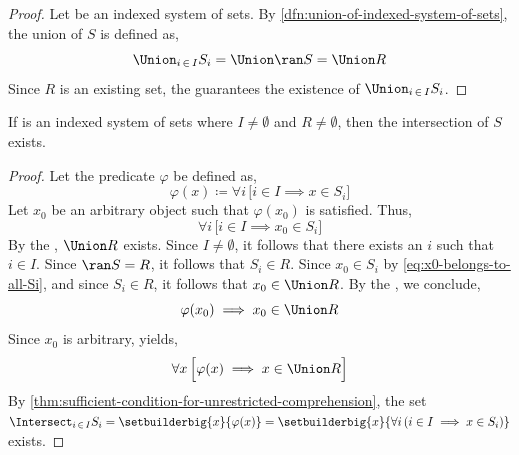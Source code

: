 \begin{proof}
    Let  be an indexed system of sets. By \cref{dfn:union-of-indexed-system-of-sets}, the
    union of \( S \) is defined as,
    \begin{equation*}
        \Union_{i \,\in\, I} S_{i} = \Union \ran S = \Union R
    \end{equation*}
    Since \( R \) is an existing set, the  guarantees the existence of \( \Union_{i \,\in\, I} S_{i} \).
\end{proof}

\begin{thm}
    \label{thm:existence-of-the-intersection-of-an-indexed-system-of-sets}
    If  is an indexed system of sets where \( I \neq \emptyset \) and \( R \neq \emptyset \),
    then the intersection of \( S \) exists.
\end{thm}

\begin{proof}
    Let the predicate \( \varphi \) be defined as,
    \begin{equation*}
        \varphi(x) \coloneq \forall i \, \Big[ i \in I \implies x \in S_{i} \Big]
    \end{equation*}
    Let \( x_{0} \) be an arbitrary object such that \( \varphi(x_{0}) \) is satisfied. Thus,
    \begin{equation}
        \label{eq:x0-belongs-to-all-Si}
        \forall i \, \Big[ i \in I \implies x_{0} \in S_{i} \Big]
    \end{equation}
    By the , \( \Union R \) exists. Since \( I \neq \emptyset \),
    it follows that there exists an \( i \) such that \( i \in I \). Since \( \ran S = R \),
    it follows that \( S_{i} \in R \). Since \( x_{0} \in S_{i} \) by \eqref{eq:x0-belongs-to-all-Si},
    and since \( S_{i} \in R \), it follows that \( x_{0} \in \Union R \). By the ,
    we conclude,
    \begin{equation*}
        \varphi(x_{0}) \implies x_{0} \in \Union R
    \end{equation*}
    Since \( x_{0} \) is arbitrary,  yields,
    \begin{equation*}
        \forall x \, \Big[ \varphi(x) \implies x \in \Union R \Big]
    \end{equation*}
    By \cref{thm:sufficient-condition-for-unrestricted-comprehension}, the set
    \( \Intersect_{i \,\in\, I} S_{i} = \setbuilderbig{x}{\varphi(x)} = \setbuilderbig{x}{\forall i \, \mleft( i \in I \implies x \in S_{i} \mright)} \)
    exists.
\end{proof}

